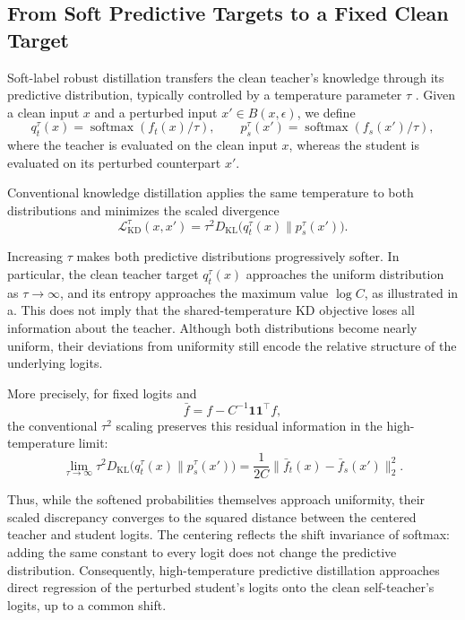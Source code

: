 \subsection{From Soft Predictive Targets to a Fixed Clean Target}
\label{sec:fragile}

Soft-label robust distillation transfers the clean teacher's knowledge through
its predictive distribution, typically controlled by a temperature parameter
\(\tau\) \citep{ard,rslad,adr,bmtard}.
Given a clean input \(x\) and a perturbed input
\(x'\in B(x,\epsilon)\), we define
\begin{equation}
q_t^\tau(x)
=
\operatorname{softmax}(f_t(x)/\tau),
\qquad
p_s^\tau(x')
=
\operatorname{softmax}(f_s(x')/\tau),
\label{eqn:soft_targets}
\end{equation}
where the teacher is evaluated on the clean input \(x\), whereas the student
is evaluated on its perturbed counterpart \(x'\).

Conventional knowledge distillation applies the same temperature to both
distributions and minimizes the scaled divergence
\begin{equation}
\mathcal L_{\mathrm{KD}}^\tau(x,x')
=
\tau^2
D_{\mathrm{KL}}
\bigl(q_t^\tau(x)\|p_s^\tau(x')\bigr).
\label{eqn:kd_variants}
\end{equation}

Increasing \(\tau\) makes both predictive distributions progressively softer.
In particular, the clean teacher target \(q_t^\tau(x)\) approaches the
uniform distribution as \(\tau\to\infty\), and its entropy approaches the
maximum value \(\log C\), as illustrated in
a.
This does not imply that the shared-temperature KD objective loses all
information about the teacher.
Although both distributions become nearly uniform, their deviations from
uniformity still encode the relative structure of the underlying logits.

More precisely, for fixed logits and
\[
\bar f
=
f-C^{-1}\mathbf 1\mathbf 1^\top f,
\]
the conventional \(\tau^2\) scaling preserves this residual information in
the high-temperature limit:
\begin{equation}
\lim_{\tau\to\infty}
\tau^2
D_{\mathrm{KL}}
\bigl(q_t^\tau(x)\|p_s^\tau(x')\bigr)
=
\frac{1}{2C}
\lVert
\bar f_t(x)-\bar f_s(x')
\rVert_2^2.
\label{eqn:kd_limit}
\end{equation}

Thus, while the softened probabilities themselves approach uniformity, their
scaled discrepancy converges to the squared distance between the centered
teacher and student logits.
The centering reflects the shift invariance of softmax: adding the same
constant to every logit does not change the predictive distribution.
Consequently, high-temperature predictive distillation approaches direct
regression of the perturbed student's logits onto the clean self-teacher's
logits, up to a common shift.

